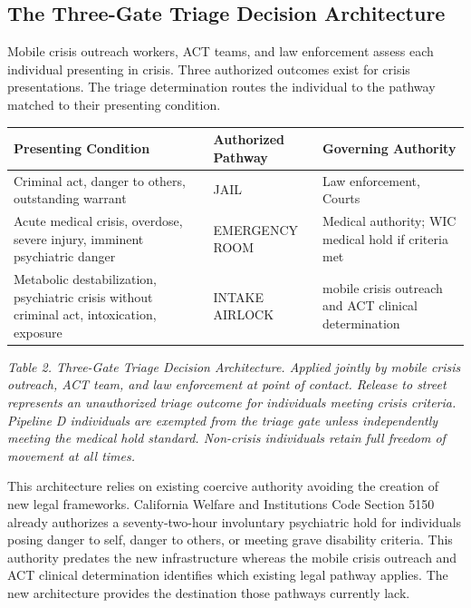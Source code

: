 \documentclass[12pt, letterpaper]{article}
\begin{document}
\subsection{The Three-Gate Triage Decision Architecture}

Mobile crisis outreach workers, ACT teams, and law enforcement assess each individual presenting in crisis. Three authorized outcomes exist for crisis presentations. The triage determination routes the individual to the pathway matched to their presenting condition.

{\singlespacing
\begin{tabularx}{\textwidth}{@{}p{5.5cm}p{3cm}X@{}}
\toprule
\rowcolor{rowgray}
Presenting Condition & Authorized Pathway & Governing Authority \\
\midrule
Criminal act, danger to others, outstanding warrant & JAIL & Law enforcement, Courts \\
\rowcolor{rowgray}
Acute medical crisis, overdose, severe injury, imminent psychiatric danger & EMERGENCY ROOM & Medical authority; WIC medical hold if criteria met \\
Metabolic destabilization, psychiatric crisis without criminal act, intoxication, exposure & INTAKE AIRLOCK & mobile crisis outreach and ACT clinical determination \\
\bottomrule
\end{tabularx}\par
\vspace{8pt}
\noindent\textit{Table 2. Three-Gate Triage Decision Architecture. Applied jointly by mobile crisis outreach, ACT team, and law enforcement at point of contact. Release to street represents an unauthorized triage outcome for individuals meeting crisis criteria. Pipeline D individuals are exempted from the triage gate unless independently meeting the medical hold standard. Non-crisis individuals retain full freedom of movement at all times.}
\par}

This architecture relies on existing coercive authority avoiding the creation of new legal frameworks. California Welfare and Institutions Code Section 5150 already authorizes a seventy-two-hour involuntary psychiatric hold for individuals posing danger to self, danger to others, or meeting grave disability criteria. This authority predates the new infrastructure whereas the mobile crisis outreach and ACT clinical determination identifies which existing legal pathway applies. The new architecture provides the destination those pathways currently lack.
\end{document}
